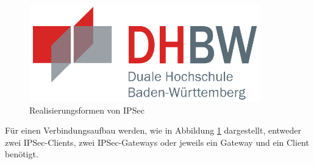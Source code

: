 \begin{figure}[htb]
	\centering
	\includegraphics[width=10cm]{graphics/dhbw.png}
	\caption[Realisierungsformen von IPSec]{Realisierungsformen von IPSec \footnotemark}
	\label{abb:IPSec}
\end{figure}

Für einen Verbindungsaufbau werden, wie in Abbildung \ref{abb:IPSec} dargestellt, entweder zwei IPSec-Clients, zwei IPSec-Gateways oder jeweils ein Gateway und ein Client benötigt.


